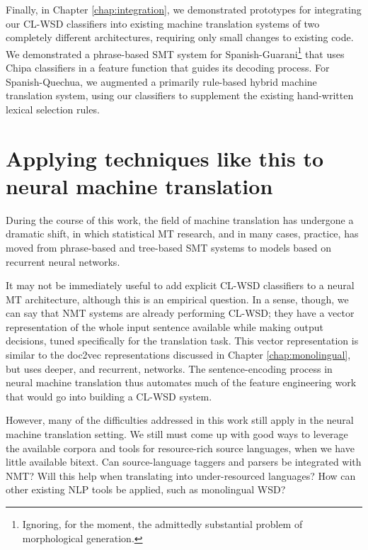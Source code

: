 Finally, in Chapter \ref{chap:integration}, we demonstrated prototypes for
integrating our CL-WSD classifiers into existing machine translation systems of
two completely different architectures, requiring only small changes to
existing code.  We demonstrated a phrase-based SMT system for
Spanish-Guarani\footnote{Ignoring, for the moment, the admittedly substantial
problem of morphological generation.} that uses Chipa classifiers in a feature
function that guides its decoding process. For Spanish-Quechua, we augmented a
primarily rule-based hybrid machine translation system, using our classifiers
to supplement the existing hand-written lexical selection rules.

\section{Applying techniques like this to neural machine translation}
During the course of this work, the field of machine translation has undergone
a dramatic shift, in which statistical MT research, and in many cases,
practice\cite{gnmt}, has moved from phrase-based and tree-based SMT systems to
models based on recurrent neural networks.

It may not be immediately useful to add explicit CL-WSD classifiers to a neural
MT architecture, although this is an empirical question. In a sense, though, we
can say that NMT systems are already performing CL-WSD; they have a vector
representation of the whole input sentence available while making output
decisions, tuned specifically for the translation task. This vector
representation is similar to the doc2vec representations discussed in Chapter
\ref{chap:monolingual}, but uses deeper, and recurrent, networks. The
sentence-encoding process in neural machine translation thus automates much of
the feature engineering work that would go into building a CL-WSD system.

However, many of the difficulties addressed in this work still apply in the
neural machine translation setting. We still must come up with good ways to
leverage the available corpora and tools for resource-rich source languages,
when we have little available bitext. Can source-language taggers and parsers
be integrated with NMT? Will this help when translating into under-resourced
languages? How can other existing NLP tools be applied, such as monolingual
WSD?

